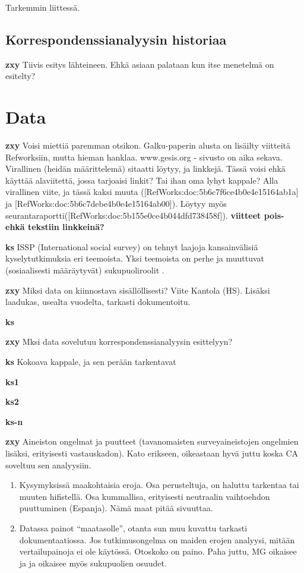 \documentclass[finnish,]{book}
\begin{document}
Tarkemmin liittessä.

\hypertarget{korrespondenssianalyysin-historiaa}{%
\section{Korrespondenssianalyysin
historiaa}\label{korrespondenssianalyysin-historiaa}}

\textbf{zxy} Tiivis esitys lähteineen. Ehkä asiaan palataan kun itse
menetelmä on esitelty?

\hypertarget{data}{%
\chapter{Data}\label{data}}

\textbf{zxy} Voisi miettiä paremman otsikon. Galku-paperin alusta on
lisäilty viitteitä Refworksiin, mutta hieman hanklaa. www.gesis.org -
sivusto on aika sekava. Virallinen (heidän määrittelemä) sitaatti
löytyy, ja linkkejä. Tässä voisi ehkä käyttää alaviitettä, jossa
tarjoaisi linkit? Tai ihan oma lyhyt kappale? Alla virallinen viite, ja
tässä kaksi muuta ({[}RefWorks:doc:5b6c7f6ce4b0e4e15164ab1a{]} ja
{[}RefWorks:doc:5b6c7debe4b0e4e15164ab00{]}). Löytyy myös
seurantaraportti({[}RefWorks:doc:5b155e0ce4b044dfd738458f{]}).
\textbf{viitteet pois- ehkä tekstiin linkkeinä?}

\textbf{ks} ISSP (International social survey) on tehnyt laajoja
kansainvälisiä kyselytutkimuksia eri teemoista. Yksi teemoista on perhe
ja muuttuvat (sosiaalisesti määräytyvät) sukupuoliroolit
\citep{RefWorks:doc:5b6c7b0de4b0fd36f5bb4c2a}.

\textbf{zxy} Miksi data on kiinnostava sisällöllisesti? Viite Kantola
(HS). Lisäksi laadukas, usealta vuodelta, tarkasti dokumentoitu.

\textbf{ks}

\textbf{zxy} Mksi data sovelutuu korrespondenssianalyysin esittelyyn?

\textbf{ks} Kokoava kappale, ja sen perään tarkentavat

\textbf{ks1}

\textbf{ks2}

\textbf{ks-n}

\textbf{zxy} Aineiston ongelmat ja puutteet (tavanomaisten
surveyaineistojen ongelmien lisäksi, erityisesti vastauskadon). Kato
erikseen, oikeastaan hyvä juttu koska CA soveltuu sen analyysiin.

\begin{enumerate}
\def\labelenumi{\arabic{enumi}.}
\item
  Kysymyksissä maakohtaisia eroja. Osa perusteltuja, on haluttu
  tarkentaa tai muuten hifistellä. Osa kummallisa, erityisesti
  neutraalin vaihtoehdon puuttuminen (Espanja). Nämä maat pitää
  sivuuttaa.
\item
  Datassa painot ``maatasolle'', otanta sun muu kuvattu tarkasti
  dokumentaatiossa. Jos tutkimusongelma on maiden erojen analyysi,
  mitään vertailupainoja ei ole käytössä. Otoskoko on paino. Paha juttu,
  MG oikaisee ja ja oikaisee myös sukupuolien osuudet.
\end{enumerate}
\end{document}
